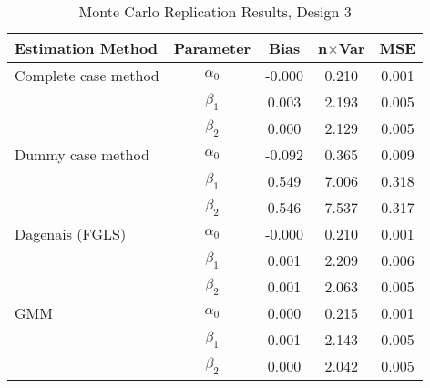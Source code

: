 \begin{table}
\centering
\caption{Monte Carlo Replication Results, Design 3}
\label{table:MCReplicationResultsDesign3}
\begin{tabular}{lcccc}
\toprule
Estimation Method & Parameter & Bias & n$\times$Var & MSE \\
\midrule
Complete case method & $\alpha_0$ & -0.000 & 0.210 & 0.001 \\
 & $\beta_1$ & 0.003 & 2.193 & 0.005 \\
 & $\beta_2$ & 0.000 & 2.129 & 0.005 \\
Dummy case method & $\alpha_0$ & -0.092 & 0.365 & 0.009 \\
 & $\beta_1$ & 0.549 & 7.006 & 0.318 \\
 & $\beta_2$ & 0.546 & 7.537 & 0.317 \\
Dagenais (FGLS) & $\alpha_0$ & -0.000 & 0.210 & 0.001 \\
 & $\beta_1$ & 0.001 & 2.209 & 0.006 \\
 & $\beta_2$ & 0.001 & 2.063 & 0.005 \\
GMM & $\alpha_0$ & 0.000 & 0.215 & 0.001 \\
 & $\beta_1$ & 0.001 & 2.143 & 0.005 \\
 & $\beta_2$ & 0.000 & 2.042 & 0.005 \\
\bottomrule
\end{tabular}
\end{table}

